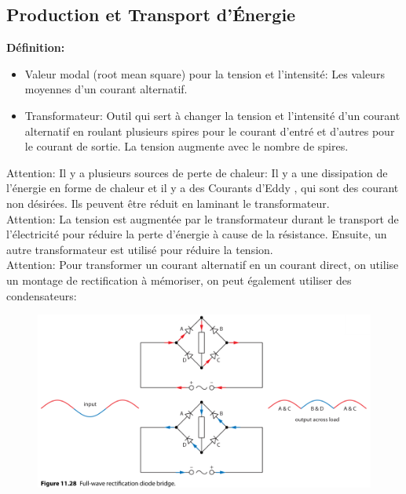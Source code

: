 \documentclass[french, a4paper, 12pt]{article}
\begin{document}
\subsection{Production et Transport d'Énergie}
\textbf{Définition:}
\begin{itemize}
\item Valeur modal (root mean square) pour la tension et l'intensité: Les valeurs moyennes d'un courant alternatif.
\item Transformateur: Outil qui sert à changer la tension et l'intensité d'un courant alternatif en roulant plusieurs spires pour le courant d'entré et d'autres pour le courant de sortie. La tension augmente avec le nombre de spires.
\end{itemize}
Attention: Il y a plusieurs sources de perte de chaleur: Il y a une dissipation de l'énergie en forme de chaleur et il y a des \og Courants d'Eddy \fg{}, qui sont des courant non désirées. Ils peuvent être réduit en laminant le transformateur.\\
Attention: La tension est augmentée par le transformateur durant le transport de l'électricité pour réduire la perte d'énergie à cause de la résistance. Ensuite, un autre transformateur est utilisé pour réduire la tension.\\
Attention: Pour transformer un courant alternatif en un courant direct, on utilise un montage de rectification à mémoriser, on peut également utiliser des condensateurs:
\begin{figure}[H]
\centering
\includegraphics[scale=0.6]{rectification}
\end{figure}
\end{document}
